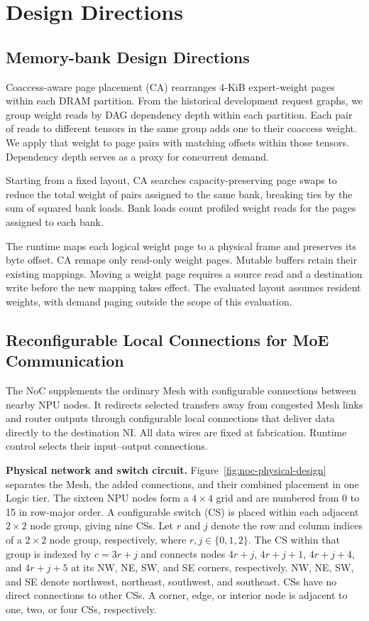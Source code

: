 \documentclass[conference,10pt]{IEEEtran}
\begin{document}
\section{Design Directions}

\subsection{Memory-bank Design Directions}
\label{sec:bank-design}

Coaccess-aware page placement (CA) rearranges 4-KiB expert-weight pages
within each DRAM partition. From the historical development request
graphs, we group weight reads by DAG dependency depth within each
partition. Each pair of reads to different tensors in the same group
adds one to their coaccess weight. We apply that weight to page pairs
with matching offsets within those tensors. Dependency depth serves as
a proxy for concurrent demand.

Starting from a fixed layout, CA searches capacity-preserving page swaps
to reduce the total weight of pairs assigned to the same bank, breaking
ties by the sum of squared bank loads. Bank loads count profiled weight
reads for the pages assigned to each bank.


The runtime maps each logical weight page to a physical frame and
preserves its byte offset. CA remaps only read-only weight pages.
Mutable buffers retain their existing mappings. Moving a weight page
requires a source read and a destination write before the new mapping
takes effect. The evaluated layout assumes resident weights, with demand
paging outside the scope of this evaluation.

\subsection{Reconfigurable Local Connections for MoE Communication}
\label{sec:noc-design}

The NoC supplements the ordinary Mesh with configurable connections between
nearby NPU nodes. It redirects selected transfers away from congested Mesh
links and router outputs through configurable local connections that deliver
data directly to the destination NI. All data wires are fixed at fabrication.
Runtime control selects their input--output connections.

\noindent\textbf{Physical network and switch circuit.}
Figure~\ref{fig:noc-physical-design} separates the Mesh, the added connections,
and their combined placement in one Logic tier. The sixteen NPU nodes form a
$4\times4$ grid and are numbered from 0 to 15 in row-major order.
A configurable switch (CS) is placed within each adjacent $2\times2$ node
group, giving nine CSs. Let $r$ and $j$ denote the row and column indices of
a $2\times2$ node group, respectively, where $r,j\in\{0,1,2\}$.
The CS within that group is indexed by $c=3r+j$ and connects nodes
$4r+j$, $4r+j+1$, $4r+j+4$, and $4r+j+5$ at its NW, NE, SW, and SE
corners, respectively. NW, NE, SW, and SE denote
northwest, northeast, southwest, and southeast. CSs have no direct connections
to other CSs. A corner, edge, or interior node is adjacent to one, two, or four
CSs, respectively.
\end{document}
